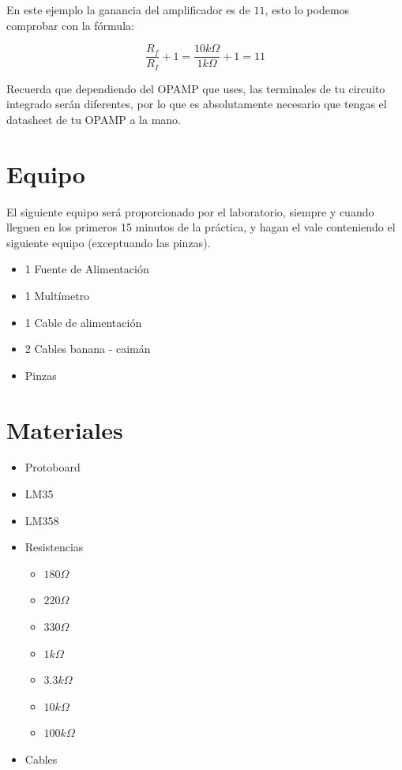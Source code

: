 		    En este ejemplo la ganancia del amplificador es de $11$, esto lo podemos comprobar con la fórmula:

		    \begin{equation}
		    	\frac{R_f}{R_I} + 1 = \frac{10 k \Omega}{1 k \Omega} + 1 = 11
		    \end{equation}

			Recuerda que dependiendo del OPAMP que uses, las terminales de tu circuito integrado serán diferentes, por lo que es absolutamente necesario que tengas el datasheet de tu OPAMP a la mano.


\section{Equipo}

	El siguiente equipo será proporcionado por el laboratorio, siempre y cuando lleguen en los primeros 15 minutos de la práctica, y hagan el vale conteniendo el siguiente equipo (exceptuando las pinzas).

	\begin{itemize}
		\item 1 Fuente de Alimentación
		\item 1 Multímetro
		\item 1 Cable de alimentación
		\item 2 Cables banana - caimán
		\item Pinzas
	\end{itemize}


\section{Materiales}

	\begin{itemize}
		\item Protoboard
		\item LM35
		\item LM358
		\item Resistencias
		\begin{itemize}
			\item $180 \Omega$
			\item $220 \Omega$
			\item $330 \Omega$
			\item $1 k\Omega$
			\item $3.3 k\Omega$
			\item $10 k\Omega$
			\item $100 k\Omega$
		\end{itemize}
		\item Cables
	\end{itemize}

